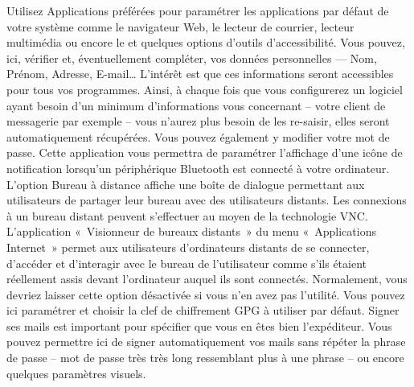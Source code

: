 Utilisez Applications préférées pour paramétrer les applications par défaut de votre système comme le navigateur Web, le lecteur de courrier, lecteur multimédia ou encore le  et quelques options d'outils d'accessibilité.
Vous pouvez, ici, vérifier et, éventuellement compléter, vos données personnelles --- Nom, Prénom, Adresse, E-mail\ldots{} L'intérêt est que ces informations seront accessibles pour tous vos programmes. Ainsi, à chaque fois que vous configurerez un logiciel ayant besoin d'un minimum d'informations vous concernant -- votre client de messagerie par exemple -- vous n'aurez plus besoin de les re-saisir, elles seront automatiquement récupérées.  Vous pouvez également y modifier votre mot de passe.
Cette application vous permettra de paramétrer l'affichage d'une icône de notification lorsqu'un périphérique Bluetooth est connecté à votre ordinateur.
L'option Bureau à distance affiche une boîte de dialogue permettant aux utilisateurs de partager leur bureau avec des utilisateurs distants. Les connexions à un bureau distant peuvent s'effectuer au moyen de la technologie VNC. L'application «~Visionneur de bureaux distants~» du menu «~Applications \FlecheDroite Internet~» permet aux utilisateurs d'ordinateurs distants de se connecter, d'accéder et d'interagir avec le bureau de l'utilisateur comme s'ils étaient réellement assis devant l'ordinateur auquel ils sont connectés. Normalement, vous devriez laisser cette option désactivée si vous n'en avez pas l'utilité.
Vous pouvez ici paramétrer et choisir la clef de chiffrement GPG à utiliser par défaut. Signer ses mails est important pour spécifier que vous en êtes bien l'expéditeur. Vous pouvez permettre ici de signer automatiquement vos mails sans répéter la phrase de passe -- mot de passe très très long ressemblant plus à une phrase -- ou encore quelques paramètres visuels.
